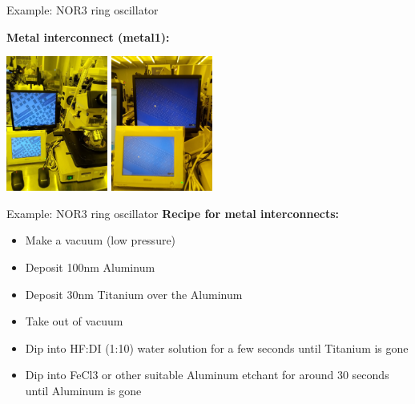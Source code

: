 \documentclass[aspectratio=169]{beamer}
\begin{document}
\begin{frame}{Example: NOR3 ring oscillator}
\begin{center}
	\textbf{Metal interconnect (metal1):}

	\includegraphics[width=0.25\textwidth]{images/20181218_115931.jpg}
	\includegraphics[width=0.25\textwidth]{images/20181218_161016.jpg}
\end{center}
\end{frame}

\begin{frame}{Example: NOR3 ring oscillator}
	\textbf{Recipe for metal interconnects:}

	\begin{itemize}
		\item Make a vacuum (low pressure)
		\item Deposit 100nm Aluminum
		\item Deposit 30nm Titanium over the Aluminum
		\item Take out of vacuum
		\item Dip into HF:DI (1:10) water solution for a few seconds until Titanium is gone
		\item Dip into FeCl3 or other suitable Aluminum etchant for around 30 seconds until Aluminum is gone
	\end{itemize}
	
\end{frame}
\end{document}
